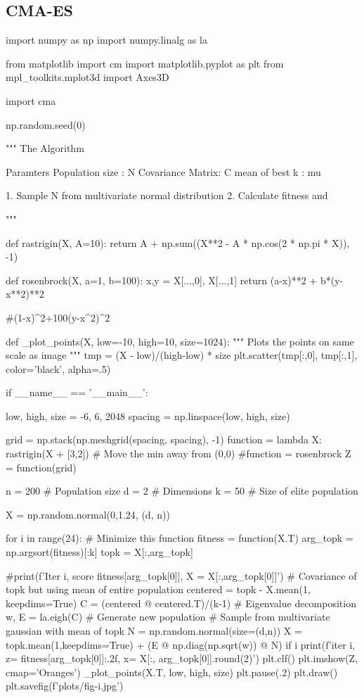 \documentclass[12pt]{article}
\begin{document}
\subsection{CMA-ES}
\begin{python}
	import numpy as np
	import numpy.linalg as la
	
	
	from matplotlib import cm
	import matplotlib.pyplot as plt
	from mpl_toolkits.mplot3d import Axes3D
	
	import cma
	
	np.random.seed(0)
	
	"""
	The Algorithm
	
	Paramters
	Population size  : N
	Covariance Matrix: C
	mean of best k   : mu
	
	1. Sample N from multivariate normal distribution
	2. Calculate fitness and 
	
	"""
	
	def rastrigin(X, A=10):
		return A + np.sum((X**2 - A * np.cos(2 * np.pi * X)), -1)
	
	def rosenbrock(X, a=1, b=100):
		x,y = X[...,0], X[...,1]
		return (a-x)**2 + b*(y-x**2)**2
	
	#(1-x)^2+100(y-x^2)^2
		
	
	def _plot_points(X, low=-10, high=10, size=1024):
		""" Plots the points on same scale as image """
		tmp = (X - low)/(high-low) * size
		plt.scatter(tmp[:,0], tmp[:,1], color='black', alpha=.5)
	
	if __name__ == '__main__':
	
		low, high, size = -6, 6, 2048
		spacing = np.linspace(low, high, size)    
	
		grid = np.stack(np.meshgrid(spacing, spacing), -1)
		function = lambda X: rastrigin(X + [3,2])   # Move the min away from (0,0)
		#function = rosenbrock
		Z = function(grid)
		
	
		 
		n = 200     # Population size
		d = 2       # Dimensions
		k = 50      # Size of elite population
	
		X = np.random.normal(0,1.24, (d, n))
	
		for i in range(24):
			# Minimize this function
			fitness = function(X.T)
			arg_topk = np.argsort(fitness)[:k]
			topk = X[:,arg_topk]
	
			#print(f'Iter {i}, score {fitness[arg_topk[0]]}, X = {X[:,arg_topk[0]]}')
			# Covariance of topk but using mean of entire population
			centered = topk - X.mean(1, keepdims=True)
			C = (centered @ centered.T)/(k-1)
			# Eigenvalue decomposition
			w, E = la.eigh(C)
			# Generate new population
			# Sample from multivariate gaussian with mean of topk
			N = np.random.normal(size=(d,n))
			X = topk.mean(1,keepdims=True) + (E @ np.diag(np.sqrt(w)) @ N)
			if i %
				print(f'iter {i}, z= {fitness[arg_topk[0]]:.2f}, x= {X[:, arg_topk[0]].round(2)}')
				plt.clf()
				plt.imshow(Z, cmap='Oranges')
				_plot_points(X.T, low, high, size)
				plt.pause(.2)
				plt.draw()
				plt.savefig(f'plots/fig-{i}.jpg')
\end{python}



\end{document}

